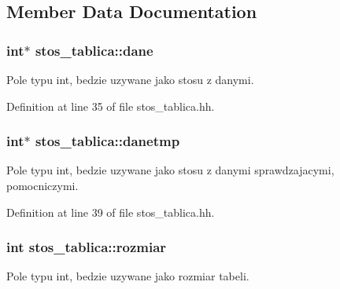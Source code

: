 \subsection{Member Data Documentation}
\hypertarget{classstos__tablica_a008b0f69384d5d987782c2f24fcbd387}{
\subsubsection[{dane}]{\setlength{\rightskip}{0pt plus 5cm}int$\ast$ stos\-\_\-tablica\-::dane\hspace{0.3cm}{\ttfamily [private]}}}\label{classstos__tablica_a008b0f69384d5d987782c2f24fcbd387}


Pole typu int, bedzie uzywane jako stosu z danymi. 



Definition at line 35 of file stos\-\_\-tablica.\-hh.

\hypertarget{classstos__tablica_a2ee83414df31c2f56383199a5d47c755}{
\subsubsection[{danetmp}]{\setlength{\rightskip}{0pt plus 5cm}int$\ast$ stos\-\_\-tablica\-::danetmp\hspace{0.3cm}{\ttfamily [private]}}}\label{classstos__tablica_a2ee83414df31c2f56383199a5d47c755}


Pole typu int, bedzie uzywane jako stosu z danymi sprawdzajacymi, pomocniczymi. 



Definition at line 39 of file stos\-\_\-tablica.\-hh.

\hypertarget{classstos__tablica_aa9c1d33bd477174602d2632c74ebea9c}{
\subsubsection[{rozmiar}]{\setlength{\rightskip}{0pt plus 5cm}int stos\-\_\-tablica\-::rozmiar\hspace{0.3cm}{\ttfamily [private]}}}\label{classstos__tablica_aa9c1d33bd477174602d2632c74ebea9c}


Pole typu int, bedzie uzywane jako rozmiar tabeli. 



